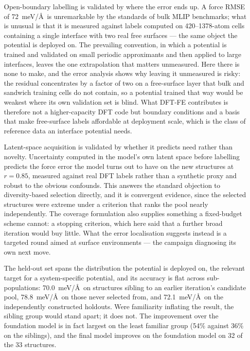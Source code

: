 \documentclass[11pt]{article}
\begin{document}
Open-boundary labelling is validated by where the error ends up. A force RMSE of
72~meV/\AA\ is unremarkable by the standards of bulk MLIP benchmarks; what is
unusual is that it is measured against labels computed on 420--1378-atom cells
containing a single interface with two real free surfaces --- the same object
the potential is deployed on. The prevailing convention, in which a potential
is trained and validated on small periodic approximants and then applied to
large interfaces, leaves the one extrapolation that matters unmeasured. Here
there is none to make, and the error analysis shows why leaving it unmeasured
is risky: the residual concentrates by a factor of two on a free-surface layer
that bulk and sandwich training cells do not contain, so a potential trained
that way would be weakest where its own validation set is blind. What DFT-FE
contributes is therefore not a higher-capacity DFT code but boundary conditions
and a basis that make free-surface labels affordable at deployment scale, which
is the class of reference data an interface potential needs.

Latent-space acquisition is validated by whether it predicts need rather than
novelty. Uncertainty computed in the model's own latent space before labelling
predicts the force error the model turns out to have on the new structures at
$r=0.85$, measured against real DFT labels rather than a synthetic proxy and
robust to the obvious confounds. This answers the standard objection to
diversity-based selection directly, and it is convergent evidence, since the
selected structures were extreme under a criterion that ranks the pool nearly
independently. The coverage formulation also supplies something a fixed-budget
scheme cannot: a stopping criterion, which here said that a further broad
iteration would buy little. What the error localisation suggests instead is a
targeted round aimed at surface environments --- the campaign diagnosing its
own next move.

The held-out set spans the distribution the potential is deployed on, the
relevant target for a system-specific potential, and its accuracy is flat
across sub-populations: 70.0~meV/\AA\ on structures sibling to an earlier
iteration's candidate pool, 78.8~meV/\AA\ on those never selected from, and
72.1~meV/\AA\ on the independently constructed holdouts. Were familiarity
inflating the result, the sibling group would stand apart; it does not. The
improvement over the foundation model is in fact largest on the least familiar
group (54\% against 36\% on the siblings), and the final model improves on the
foundation model on 32 of the 33 structures.
\end{document}
